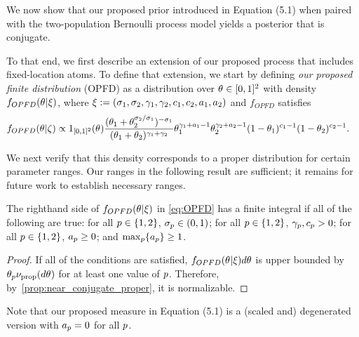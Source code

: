 

We now show that our proposed prior introduced in Equation (5.1) when paired with the two-population Bernoulli process model yields a posterior that is conjugate.

To that end, we first describe an extension of our proposed process that includes fixed-location atoms. To define that extension, we start by defining \emph{our proposed finite distribution} (OPFD) as a distribution over $\vecvariantfreq{} \in [0,1]^2$ with density $f_{OPFD}(\vecvariantfreq{} | \allopfdhyper)$, where $\allopfdhyper := (\rate{1}, \rate{2}, \corr{1}, \corr{2}, \conc{1}, \conc{2}, \fixlocparam{1}, \fixlocparam{2})$ and $f_{OPFD}$ satisfies
\begin{align}
	& f_{OPFD}(\vecvariantfreq{} | \allhyper) \propto \bm{1}_{[0,1]^2}(\vecvariantfreq{}) \frac{(\variantfreqperpop{1}+\variantfreqperpop{2}^{\rate{2}/\rate{1}})^{-\rate{1}}}{(\variantfreqperpop{1}+\variantfreqperpop{2})^{\corr{1}+\corr{2}}}\variantfreqperpop{1}^{\corr{1}+\fixlocparam{1}-1}\variantfreqperpop{2}^{\corr{2}+\fixlocparam{2} -1} 
		(1-\variantfreqperpop{1})^{\conc{1}-1}(1-\variantfreqperpop{2})^{\conc{2}-1}.
        \label{eq:OPFD}
\end{align}

We next verify that this density corresponds to a proper distribution for certain parameter ranges. Our ranges in the following result are sufficient; it remains for future work to establish necessary ranges.
\begin{myLemma} \label{lem:opfd_params}
The righthand side of $f_{OPFD}(\vecvariantfreq{} | \allopfdhyper)$ in \cref{eq:OPFD} has a finite integral if all of the following are true: for all $p\in \{1,2\}$, $\sigma_{p}\in(0,1)$; for all $p\in \{1,2\}$, $\gamma_{p},c_{p}>0$; for all $p\in \{1,2\}$, $a_{p}\ge 0$; and $\max_{p}\{ a_{p}\}\ge 1$.
\end{myLemma}
\begin{proof}
If all of the conditions are satisfied, $f_{OPFD}(\vecvariantfreq{} | \allopfdhyper) d \vecvariantfreq{}$ is upper bounded by $\variantfreqperpop{\popidx} \ratemeasproposed(d \vecvariantfreq{})$ for at least one value of $p$. Therefore, by~\cref{prop:near_conjugate_proper}, it is normalizable.
\end{proof}

Note that our proposed measure in Equation (5.1) is a (scaled and) degenerated version with $a_{p}=0$ for all $p$. 

